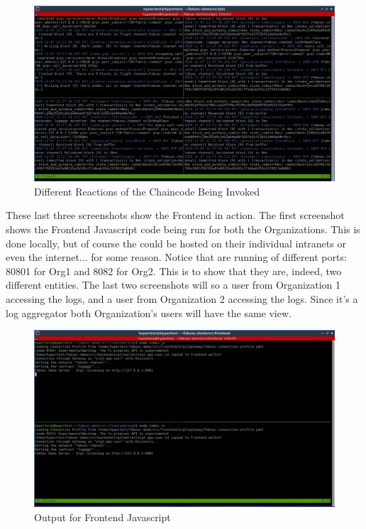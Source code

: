 		\begin{figure}[H]
		\includegraphics[width=.9\textwidth]{./fabsec-report-network-flow/network-flow-19.jpg}
		\centering
		\caption{Different Reactions of the Chaincode Being Invoked}
		\end{figure}
		
	\newpage
	\hspace{10mm}These last three screenshots show the Frontend in action. The first screenshot shows the Frontend Javascript code being run for both the Organizations. This is done locally, but of course the could be hosted on their individual intranets or even the internet... for some reason. Notice that are running of different ports: 80801 for Org1 and 8082 for Org2. This is to show that they are, indeed, two different entities. The last two screenshots will so a user from Organization 1 accessing the logs, and a user from Organization 2 accessing the logs. Since it's a log aggregator both Organization's users will have the same view.
	
		\begin{figure}[H]
		\includegraphics[width=\textwidth]{./fabsec-report-network-flow/network-flow-20.jpg}
		\caption{Output for Frontend Javascript}
		\end{figure}	
		

